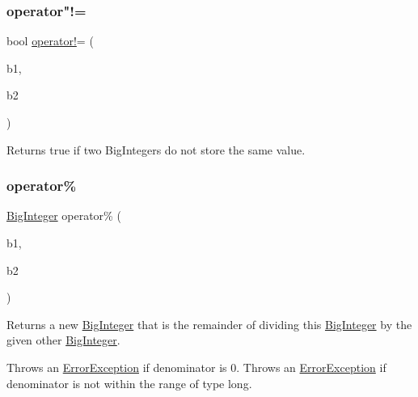 \mbox{\label{classBigInteger_aeebeaf49c2dddc5652c06ea190ff2233}} 
\subsubsection{\texorpdfstring{operator"!=}{operator!=}}
{\footnotesize\ttfamily bool \mbox{\hyperlink{classBigInteger_a4e89621e8562bf05700c80653d1b046a}{operator!}}= (\begin{DoxyParamCaption}\item[{const \mbox{\hyperlink{classBigInteger}{Big\+Integer}} \&}]{b1,  }\item[{const \mbox{\hyperlink{classBigInteger}{Big\+Integer}} \&}]{b2 }\end{DoxyParamCaption})\hspace{0.3cm}{\ttfamily [friend]}}



Returns true if two Big\+Integers do not store the same value. 

\mbox{\label{classBigInteger_a9d102d793991b160ada3d6420e82d8a2}} 
\subsubsection{\texorpdfstring{operator\%}{operator\%}}
{\footnotesize\ttfamily \mbox{\hyperlink{classBigInteger}{Big\+Integer}} operator\% (\begin{DoxyParamCaption}\item[{const \mbox{\hyperlink{classBigInteger}{Big\+Integer}} \&}]{b1,  }\item[{const \mbox{\hyperlink{classBigInteger}{Big\+Integer}} \&}]{b2 }\end{DoxyParamCaption})\hspace{0.3cm}{\ttfamily [friend]}}



Returns a new \mbox{\hyperlink{classBigInteger}{Big\+Integer}} that is the remainder of dividing this \mbox{\hyperlink{classBigInteger}{Big\+Integer}} by the given other \mbox{\hyperlink{classBigInteger}{Big\+Integer}}. 

Throws an \mbox{\hyperlink{classErrorException}{Error\+Exception}} if denominator is 0. Throws an \mbox{\hyperlink{classErrorException}{Error\+Exception}} if denominator is not within the range of type long. \mbox{\label{classBigInteger_a9264597a13bdae8e51f922f5e86cd98f}} 
